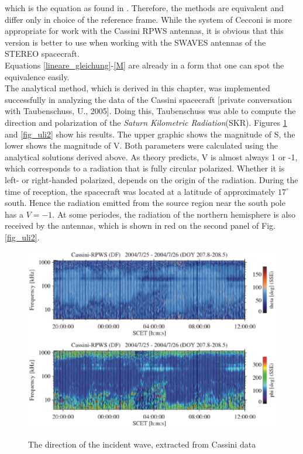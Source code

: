 \documentclass[a4paper,14pt]{extbook}
\begin{document}
which is the equation as found in \cite{cecconi04}. Therefore, the methods are equivalent and differ only in choice of the reference frame. While the system of Cecconi is more appropriate for work with the Cassini RPWS antennas, it is obvious that this version is better to use when working with the SWAVES antennas of the STEREO spacecraft.\\

Equations \ref{lineare_gleichung}-\ref{M} are already in a form that one can spot the equivalence easily.\\

The analytical method, which is derived in this chapter, was implemented successfully in analyzing the data of the Cassini spacecraft [private conversation with Taubenschuss, U., 2005]. Doing this, Taubenschuss was able to compute the direction and polarization of the \emph{Saturn Kilometric Radiation}(SKR). Figures \ref{fig_uli1} and \ref{fig_uli2} show his results. The upper graphic shows the magnitude of S, the lower shows the magnitude of V. Both parameters were calculated using the analytical solutions derived above. As theory predicts, V is almost always 1 or -1, which corresponds to a radiation that is fully circular polarized. Whether it is left- or right-handed polarized, depends on the origin of the radiation. During the time of reception, the spacecraft was located at a latitude of approximately $17^\circ $ south. Hence the radiation emitted from the source region near the south pole has a $V = -1$. At some periodes, the radiation of the northern hemisphere is also received by the antennas, which is shown in red on the second panel of Fig. \ref{fig_uli2}.

\begin{figure}
  
  \includegraphics[width=12cm]{uli3.eps}\\
  \caption{The direction of the incident wave, extracted from Cassini data \cite{uli1}}\label{fig_uli1}
\end{figure}
\end{document}
